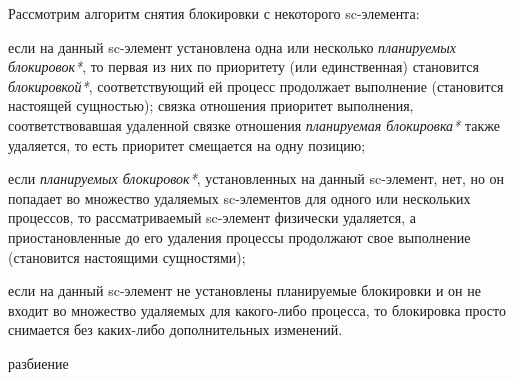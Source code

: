 Рассмотрим алгоритм снятия блокировки с некоторого sc-элемента:
\begin{textitemize}
	\item если на данный sc-элемент установлена одна или несколько \textit{планируемых блокировок*}, то первая из них по приоритету (или единственная) становится \textit{блокировкой*}, соответствующий ей процесс продолжает выполнение (становится настоящей сущностью); связка отношения приоритет выполнения, соответствовавшая удаленной связке отношения \textit{планируемая блокировка*} также удаляется, то есть приоритет смещается на одну позицию;
	\item если \textit{планируемых блокировок*}, установленных на данный sc-элемент, нет, но он попадает во множество удаляемых sc-элементов для одного или нескольких процессов, то рассматриваемый sc-элемент физически удаляется, а приостановленные до его удаления процессы продолжают свое выполнение (становится настоящими сущностями);
	\item если на данный sc-элемент не установлены планируемые блокировки и он не входит во множество удаляемых для какого-либо процесса, то блокировка просто снимается без каких-либо дополнительных изменений.
\end{textitemize}

\begin{SCn}
\begin{scnrelfromset}{разбиение}
\end{scnrelfromset}
\end{SCn}

